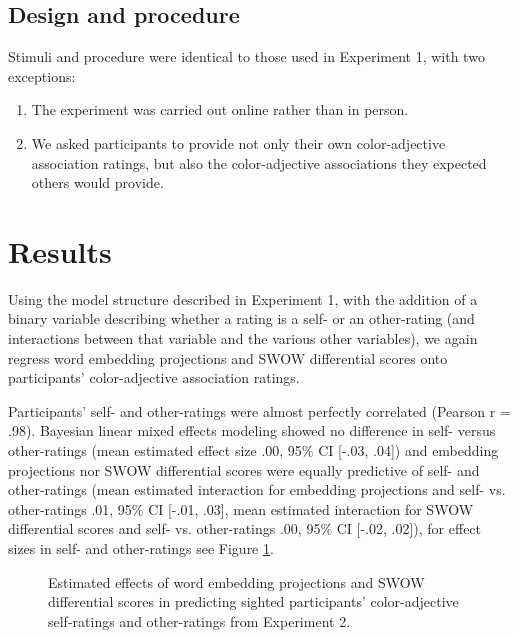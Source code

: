 \documentclass[10pt,letterpaper]{article}
\begin{document}
\subsection{Design and procedure}
Stimuli and procedure were identical to those used in Experiment 1, with two exceptions:
\begin{enumerate}
\item The experiment was carried out online rather than in person.
\item We asked participants to provide not only their own color-adjective association ratings, but also the color-adjective associations they expected others would provide.
\end{enumerate}

\section{Results}
Using the model structure described in Experiment 1, with the addition of a binary variable describing whether a rating is a self- or an other-rating (and interactions between that variable and the various other variables), we again regress word embedding projections and SWOW differential scores onto participants' color-adjective association ratings.

Participants' self- and other-ratings were almost perfectly correlated (Pearson r = .98). Bayesian linear mixed effects modeling showed no difference in self- versus other-ratings (mean estimated effect size .00, 95\% CI [-.03, .04]) and embedding projections nor SWOW differential scores were equally predictive of self- and other-ratings (mean estimated interaction for embedding projections and self- vs. other-ratings .01, 95\% CI [-.01, .03], mean estimated interaction for SWOW differential scores and self- vs. other-ratings .00, 95\% CI [-.02, .02]), for effect sizes in self- and other-ratings see Figure \ref{self_other}.

\begin{figure}[ht!]
\begin{center}
\caption{Estimated effects of word embedding projections and SWOW differential scores in predicting sighted participants' color-adjective self-ratings and other-ratings from Experiment 2.}
\label{self_other}
\end{center}
\end{figure}
\end{document}
